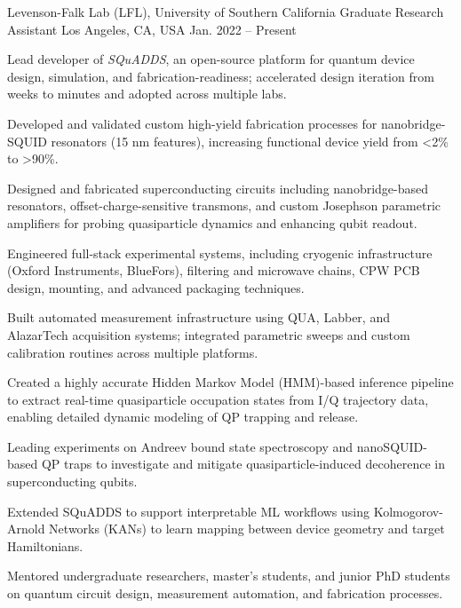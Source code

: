 
\begin{cventries}

\cventry
  {Levenson-Falk Lab (LFL), University of Southern California}
  {Graduate Research Assistant}
  {Los Angeles, CA, USA}
  {Jan. 2022 – Present}
  {
    \begin{cvitems}
      \item{Lead developer of \textit{SQuADDS}, an open-source platform for quantum device design, simulation, and fabrication-readiness; accelerated design iteration from weeks to minutes and adopted across multiple labs.}
      \item{Developed and validated custom high-yield fabrication processes for nanobridge-SQUID resonators (15 nm features), increasing functional device yield from <2\% to >90\%.}
      \item{Designed and fabricated superconducting circuits including nanobridge-based resonators, offset-charge-sensitive transmons, and custom Josephson parametric amplifiers for probing quasiparticle dynamics and enhancing qubit readout.}
      \item{Engineered full-stack experimental systems, including cryogenic infrastructure (Oxford Instruments, BlueFors), filtering and microwave chains, CPW PCB design, mounting, and advanced packaging techniques.}
      \item{Built automated measurement infrastructure using QUA, Labber, and AlazarTech acquisition systems; integrated parametric sweeps and custom calibration routines across multiple platforms.}
      \item{Created a highly accurate Hidden Markov Model (HMM)-based inference pipeline to extract real-time quasiparticle occupation states from I/Q trajectory data, enabling detailed dynamic modeling of QP trapping and release.}
      \item{Leading experiments on Andreev bound state spectroscopy and nanoSQUID-based QP traps to investigate and mitigate quasiparticle-induced decoherence in superconducting qubits.}
      \item{Extended SQuADDS to support interpretable ML workflows using Kolmogorov-Arnold Networks (KANs) to learn mapping between device geometry and target Hamiltonians.}
      \item{Mentored undergraduate researchers, master's students, and junior PhD students on quantum circuit design, measurement automation, and fabrication processes.}
    \end{cvitems}
  }


\end{cventries}
